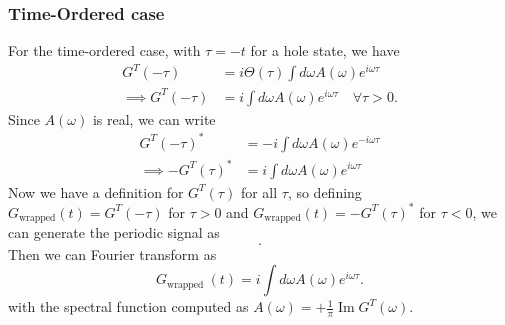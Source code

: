 

\subsubsection{Time-Ordered case}
For the time-ordered case, with $\tau=-t$ for a hole state, we have
\begin{align}
G^T(-\tau) &= i \Theta(\tau) \int d \omega A(\omega) e^{i \omega \tau}\\
\implies G^T(-\tau) &= i \int d \omega A(\omega) e^{i \omega \tau}\quad\forall \tau>0.
\end{align}
Since $A(\omega)$ is real, we can write
\begin{align}
    G^T(-\tau)^*&=-i \int d \omega A(\omega) e^{-i \omega \tau}\\
\implies -G^T(\tau)^*&=i \int d \omega A(\omega) e^{i \omega \tau}
\end{align}
Now we have a definition for $G^T(\tau)$ for all $\tau$, so defining $G_{\text{wrapped}}(t) = G^T(-\tau)$ for $\tau>0$ and $G_{\text{wrapped}}(t) = -G^T(\tau)^*$ for $\tau<0$, we can generate the periodic signal as
\begin{equation}
    [G^T(0), G^T(d\tau), \ldots, G^T(N d\tau), -G^T(-N d\tau)^*, \ldots, -G^T(-d\tau)^*].
\end{equation}
Then we can Fourier transform as
\begin{equation}
    G_{\text {wrapped }}(t)=i \int d \omega A(\omega) e^{i\omega\tau}.
\end{equation}
with the spectral function computed as $A(\omega) = +\frac{1}{\pi} \operatorname{Im} G^T(\omega)$.
